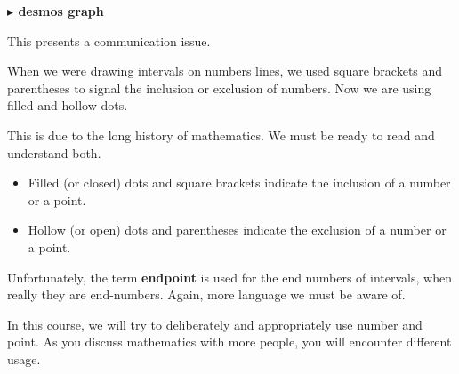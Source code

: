 \documentclass{ximera}
\begin{document}
\begin{example}
\begin{onlineOnly}
\textbf{\textcolor{blue!55!black}{$\blacktriangleright$ desmos graph}} 
\begin{center}
\end{center}
\end{onlineOnly}


\end{example}










This presents a communication issue.  


When we were drawing intervals on numbers lines, we used square brackets and parentheses to signal the inclusion or exclusion of numbers.  Now we are using filled and hollow dots. 

This is due to the long history of mathematics.  We must be ready to read and understand both.


\begin{itemize}
\item Filled (or closed) dots and square brackets indicate the inclusion of a number or a point.
\item Hollow (or open) dots and parentheses indicate the exclusion of a number or a point.
\end{itemize}

Unfortunately, the term \textbf{endpoint} is used for the end numbers of intervals, when really they are end-numbers. Again, more language we must be aware of.

In this course, we will try to deliberately and appropriately use number and point.  As you discuss mathematics with more people, you will encounter different usage.
\end{document}
